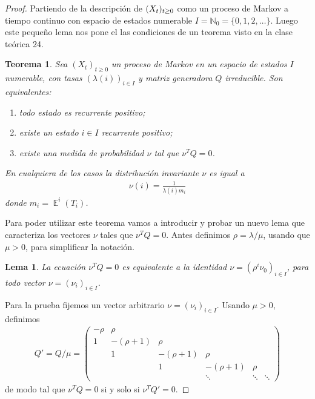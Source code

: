 \documentclass{article}
\DeclareMathOperator{\Exp}{\mathbb{E}}
\newcommand{\naturalnum}{\mathbb{N}}
\newtheorem{theorem}{Teorema}
\newtheorem{lemma}{Lema}
\theoremstyle{definition}
\begin{document}
\begin{proof}
Partiendo de la descripción de \((X_t)_{t \geq 0}\) como un proceso de Markov a tiempo continuo con espacio de estados numerable \(I =  \naturalnum_0 = \{0, 1, 2, \dots\}\).
Luego este pequeño lema nos pone el las condiciones de un teorema visto en la clase teórica 24.

\begin{theorem}
\label{theorem:PositiveRecurrentMarkovProcesses}
Sea \((X_t)_{t \geq 0}\) un proceso de Markov en un espacio de estados \(I\) numerable, con tasas \((\lambda(i))_{i \in I}\) y matriz generadora \(Q\) irreducible.
Son equivalentes:
\begin{enumerate}
	\item todo estado es recurrente positivo;
	\item existe un estado \(i \in I\) recurrente positivo;
	\item existe una medida de probabilidad \(\nu\) tal que \(\nu^{T} Q = 0\).
\end{enumerate}
En cualquiera de los casos la distribución invariante \(\nu\) es igual a
\begin{align}
	\nu(i) = \frac{1}{\lambda(i) m_i}
\end{align}
donde \(m_i = \Exp^i(T_i)\).
\end{theorem}

Para poder utilizar este teorema vamos a introducir y probar un nuevo lema que caracteriza los vectores \(\nu\) tales que \(\nu^T Q = 0\).
Antes definimos \(\rho = \lambda / \mu\), usando que \(\mu > 0\), para simplificar la notación.
\begin{lemma}
\label{lemma:LeftNullspaceOfGeneratorMatrix}
La ecuación \(\nu^T Q = 0\) es equivalente a la identidad \(\nu = (\rho^i \nu_0)_{i \in I}\), para todo vector \(\nu = (\nu_i)_{i \in I}\).
\end{lemma}
Para la prueba fijemos un vector arbitrario \(\nu = (\nu_i)_{i \in I}\).
Usando \(\mu > 0\), definimos
\begin{align}
	Q'
	=
	Q / \mu
	=
	\begin{pmatrix}
		- \rho &\rho \\
		1 &- (\rho + 1) &\rho \\
		 &1 &- (\rho + 1) &\rho \\
		 & &1 &- (\rho + 1) &\rho \\
		 & & &\ddots &\ddots &\ddots
	\end{pmatrix}
\end{align}
de modo tal que \(\nu^T Q = 0\) si y solo si \(\nu^T Q' = 0\).


\end{proof}
\end{document}
